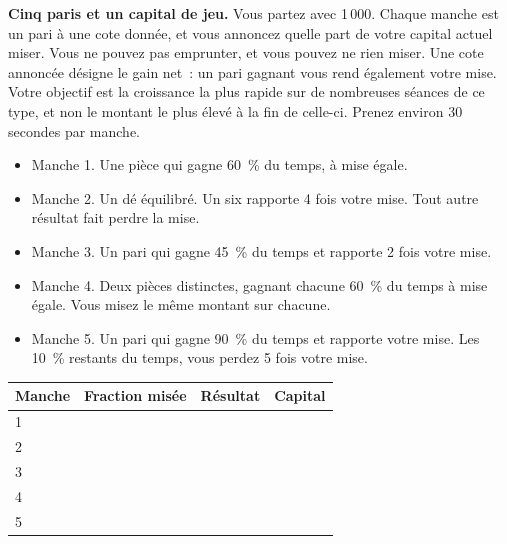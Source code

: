 \begin{question}\label{iq:iv2:played-games:4}
\textbf{Cinq paris et un capital de jeu.} Vous partez avec 1\,000. Chaque manche est un pari à une cote donnée, et vous annoncez quelle part de votre capital actuel miser. Vous ne pouvez pas emprunter, et vous pouvez ne rien miser. Une cote annoncée désigne le gain net~: un pari gagnant vous rend également votre mise. Votre objectif est la croissance la plus rapide sur de nombreuses séances de ce type, et non le montant le plus élevé à la fin de celle-ci. Prenez environ 30 secondes par manche.
\begin{itemize}
\item Manche 1. Une pièce qui gagne 60~\% du temps, à mise égale.
\item Manche 2. Un dé équilibré. Un six rapporte 4 fois votre mise. Tout autre résultat fait perdre la mise.
\item Manche 3. Un pari qui gagne 45~\% du temps et rapporte 2 fois votre mise.
\item Manche 4. Deux pièces distinctes, gagnant chacune 60~\% du temps à mise égale. Vous misez le même montant sur chacune.
\item Manche 5. Un pari qui gagne 90~\% du temps et rapporte votre mise. Les 10~\% restants du temps, vous perdez 5 fois votre mise.
\end{itemize}

\medskip
\begin{tabular}{@{}l|l|l|l@{}}
Manche & Fraction misée & Résultat & Capital \\ \hline
1 & & & \\[8pt]\hline
2 & & & \\[8pt]\hline
3 & & & \\[8pt]\hline
4 & & & \\[8pt]\hline
5 & & & \\[8pt]\hline
\end{tabular}
\end{question}
\vfill\clearpage

